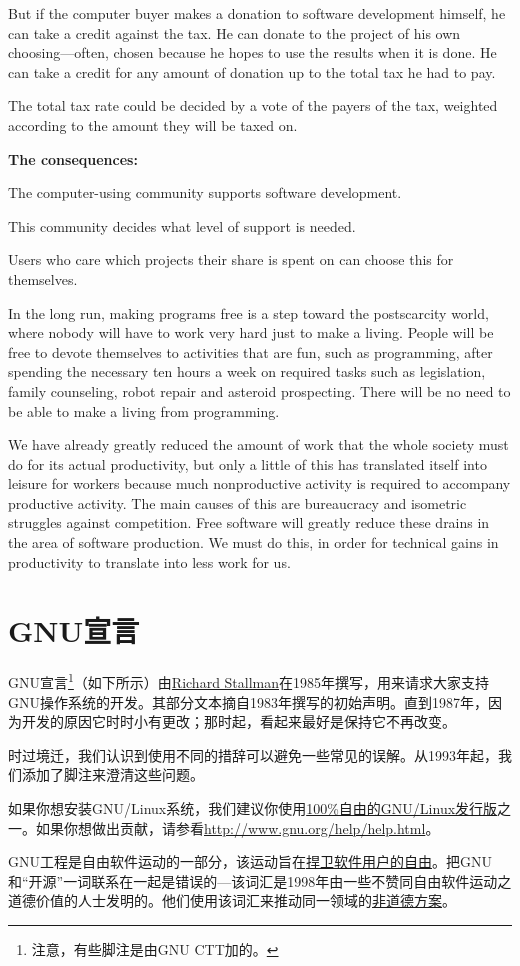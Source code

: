 But if the computer buyer makes a donation to software development himself, he can take a credit against the tax. He can donate to the project of his own choosing—often, chosen because he hopes to use the results when it is done. He can take a credit for any amount of donation up to the total tax he had to pay.\par
The total tax rate could be decided by a vote of the payers of the tax, weighted according to the amount they will be taxed on.\par
\textbf{The consequences:}\par
The computer-using community supports software development.\par
This community decides what level of support is needed.\par
Users who care which projects their share is spent on can choose this for themselves.\par
In the long run, making programs free is a step toward the postscarcity world, where nobody will have to work very hard just to make a living. People will be free to devote themselves to activities that are fun, such as programming, after spending the necessary ten hours a week on required tasks such as legislation, family counseling, robot repair and asteroid prospecting. There will be no need to be able to make a living from programming.\par
We have already greatly reduced the amount of work that the whole society must do for its actual productivity, but only a little of this has translated itself into leisure for workers because much nonproductive activity is required to accompany productive activity. The main causes of this are bureaucracy and isometric struggles against competition. Free software will greatly reduce these drains in the area of software production. We must do this, in order for technical gains in productivity to translate into less work for us.
\chapter{GNU宣言}
\cite{gnum}
GNU宣言\footnote{注意，有些脚注是由GNU CTT加的。}（如下所示）由\href{http://www.stallman.org/}{Richard Stallman}在1985年撰写，用来请求大家支持GNU操作系统的开发。其部分文本摘自1983年撰写的初始声明。直到1987年，因为开发的原因它时时小有更改；那时起，看起来最好是保持它不再改变。\par
时过境迁，我们认识到使用不同的措辞可以避免一些常见的误解。从1993年起，我们添加了脚注来澄清这些问题。\par
如果你想安装GNU/Linux系统，我们建议你使用\href{http://www.gnu.org/distros}{100\%自由的GNU/Linux发行版}之一。如果你想做出贡献，请参看\url{http://www.gnu.org/help/help.html}。\par
GNU工程是自由软件运动的一部分，该运动旨在\href{http://www.gnu.org/philosophy/free-sw.html}{捍卫软件用户的自由}。把GNU和“开源”一词联系在一起是错误的—该词汇是1998年由一些不赞同自由软件运动之道德价值的人士发明的。他们使用该词汇来推动同一领域的\href{http://www.gnu.org/philosophy/open-source-misses-the-point.html}{非道德方案}。\par
